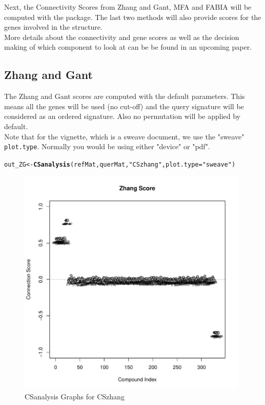 \documentclass[a4paper]{article}\usepackage[]{graphicx}\usepackage[]{color}
\makeatletter
\newcommand{\hlstr}[1]{\textcolor[rgb]{0.192,0.494,0.8}{#1}}%
\newcommand{\hlstd}[1]{\textcolor[rgb]{0.345,0.345,0.345}{#1}}%
\newcommand{\hlkwb}[1]{\textcolor[rgb]{0.69,0.353,0.396}{#1}}%
\newcommand{\hlkwc}[1]{\textcolor[rgb]{0.333,0.667,0.333}{#1}}%
\newcommand{\hlkwd}[1]{\textcolor[rgb]{0.737,0.353,0.396}{\textbf{#1}}}%
\newenvironment{kframe}{%
 \def\at@end@of@kframe{}%
 \ifinner\ifhmode%
  \def\at@end@of@kframe{\end{minipage}}%
  \begin{minipage}{\columnwidth}%
 \fi\fi%
 \def\FrameCommand##1{\hskip\@totalleftmargin \hskip-\fboxsep
 \colorbox{shadecolor}{##1}\hskip-\fboxsep
     \hskip-\linewidth \hskip-\@totalleftmargin \hskip\columnwidth}%
 \MakeFramed {\advance\hsize-\width
   \@totalleftmargin\z@ \linewidth\hsize
   \@setminipage}}%
 {\par\unskip\endMakeFramed%
 \at@end@of@kframe}
\newenvironment{knitrout}{}{} %
\makeatother
\begin{document}
\noindent Next, the Connectivity Scores from Zhang and Gant, MFA and FABIA will
be computed with the package. The last two methods will also provide scores for the
genes involved in the structure.\\
More details about the connectivity and gene scores as well as the decision
making of which component to look at can be be found in an upcoming paper.

\subsection{Zhang and Gant}
The Zhang and Gant scores are computed with the default parameters. This means
all the genes will be used (no cut-off) and the query signature will be
considered as an ordered signature. Also no permutation will be applied by
default.
\\Note that for the vignette, which is a
sweave document, we use the "sweave" \texttt{plot.type}. Normally you would be
using either "device" or "pdf".

\begin{knitrout}
\color{fgcolor}\begin{kframe}
\begin{alltt}
        \hlstd{out_ZG} \hlkwb{<-} \hlkwd{CSanalysis}\hlstd{(refMat,querMat,}\hlstr{"CSzhang"}\hlstd{,}\hlkwc{plot.type}\hlstd{=}\hlstr{"sweave"}\hlstd{)}
\end{alltt}
\end{kframe}\begin{figure}[H]


{\centering \includegraphics[width=11cm]{figure/ZG-1} 

}

\caption[CSanalysis Graphs for CSzhang]{CSanalysis Graphs for CSzhang\label{fig:ZG}}
\end{figure}


\end{knitrout}
\end{document}
